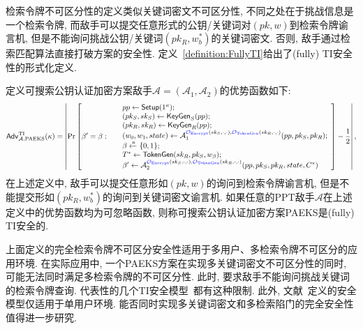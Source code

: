 检索令牌不可区分性的定义类似关键词密文不可区分性, 不同之处在于挑战信息是一个检索令牌, 而敌手可以提交任意形式的公钥/关键词对$(pk, w)$到检索令牌谕言机, 但是不能询问挑战公钥/关键词$(pk_R, w_b^*)$的关键词密文. 否则, 敌手通过检索匹配算法直接打破方案的安全性. 定义~\ref{definition:FullyTI}给出了(fully) TI安全性的形式化定义.
\begin{definition}[检索令牌不可区分安全性]\label{definition:FullyTI}
定义可搜索公钥认证加密方案敌手$\mathcal{A} = (\mathcal{A}_1, \mathcal{A}_2)$的优势函数如下:
\begin{displaymath}
\mathsf{Adv}_{\mathcal{A}, \text{PAEKS}}^{\text{TI}}(\kappa) = \left| \Pr \left[\beta' = \beta:~
\begin{array}{ll}
	& pp \leftarrow \mathsf{Setup}(1^\kappa); \\		
	& (pk_S, sk_S) \leftarrow \mathsf{KeyGen}_S(pp);\\
	& (pk_R, sk_R) \leftarrow \mathsf{KeyGen}_R(pp);\\
	& (w_0, w_1, state) \leftarrow \mathcal{A}_1^{{\color{blue} \mathcal{O}_{\text{Encrypt}}}(sk_S,\cdot, \cdot), {\color{blue} \mathcal{O}_{\text{TokenGen}}}(sk_R,\cdot, \cdot)}(pp, pk_S, pk_R); \\
	& \beta \xleftarrow{\textup{\tiny R}} \{0, 1\}; \\
	& T^* \leftarrow \mathsf{TokenGen}(sk_R, pk_S, w_\beta); \\
	& \beta' \leftarrow \mathcal{A}_2^{{\color{blue} \mathcal{O}_{\text{Encrypt}}}(sk_S,\cdot, \cdot), {\color{blue} \mathcal{O}_{\text{TokenGen}}}(sk_R,\cdot, \cdot)}(pp, pk_S, pk_R, state, C^*)
	\end{array} 
\right] - \frac{1}{2} \right|,
\end{displaymath}
在上述定义中, 敌手可以提交任意形如$(pk, w)$的询问到检索令牌谕言机, 但是不能提交形如$(pk_R, w_b^*)$的询问到关键词密文谕言机. 如果任意的PPT敌手$\mathcal{A}$在上述定义中的优势函数均为可忽略函数, 则称可搜索公钥认证加密方案PAEKS是(fully) TI安全的.
\end{definition} 

\begin{note}
上面定义的完全检索令牌不可区分安全性适用于多用户、多检索令牌不可区分的应用环境. 在实际应用中, 一个PAEKS方案在实现多关键词密文不可区分性的同时, 可能无法同时满足多检索令牌的不可区分性. 此时, 要求敌手不能询问挑战关键词的检索令牌查询. 代表性的几个TI安全模型~\cite{HL-InfSci-2017,NE-IET-InfS-2019,QCZZ-ProvSec-2021}都有这种限制. 此外, 文献~\cite{HL-InfSci-2017}定义的安全模型仅适用于单用户环境. 能否同时实现多关键词密文和多检索陷门的完全安全性值得进一步研究.
\end{note}

